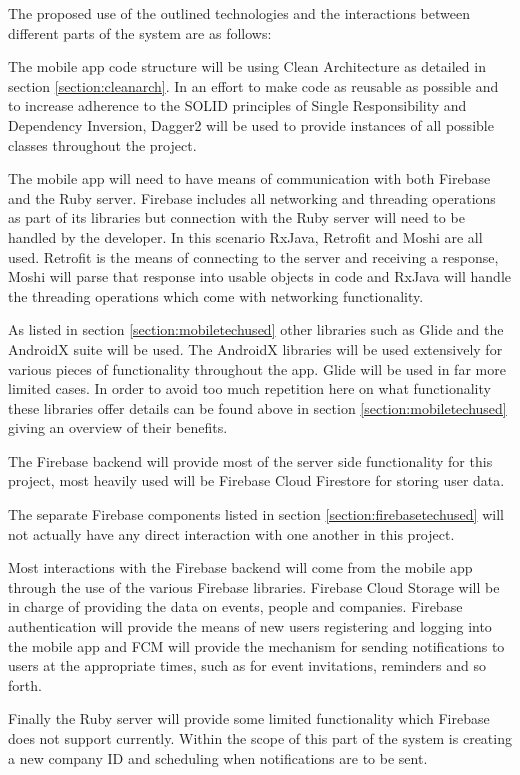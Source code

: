 The proposed use of the outlined technologies and the interactions between different parts of the system are as follows:

The mobile app code structure will be using Clean Architecture as detailed in section \ref{section:cleanarch}. In an effort to make code as reusable as possible and to increase adherence to the SOLID principles of Single Responsibility and Dependency Inversion, Dagger2 will be used to provide instances of all possible classes throughout the project.

The mobile app will need to have means of communication with both Firebase and the Ruby server. Firebase includes all networking and threading operations as part of its libraries but connection with the Ruby server will need to be handled by the developer. In this scenario RxJava, Retrofit and Moshi are all used. Retrofit is the means of connecting to the server and receiving a response, Moshi will parse that response into usable objects in code and RxJava will handle the threading operations which come with networking functionality.

As listed in section \ref{section:mobiletechused} other libraries such as Glide and the AndroidX suite will be used. The AndroidX libraries will be used extensively for various pieces of functionality throughout the app. Glide will be used in far more limited cases. In order to avoid too much repetition here on what functionality these libraries offer details can be found above in section \ref{section:mobiletechused} giving an overview of their benefits.

The Firebase backend will provide most of the server side functionality for this project, most heavily used will be Firebase Cloud Firestore for storing user data.

The separate Firebase components listed in section \ref{section:firebasetechused} will not actually have any direct interaction with one another in this project.

Most interactions with the Firebase backend will come from the mobile app through the use of the various Firebase libraries. Firebase Cloud Storage will be in charge of providing the data on events, people and companies. Firebase authentication will provide the means of new users registering and logging into the mobile app and FCM will provide the mechanism for sending notifications to users at the appropriate times, such as for event invitations, reminders and so forth.

Finally the Ruby server will provide some limited functionality which Firebase does not support currently. Within the scope of this part of the system is creating a new company ID and scheduling when notifications are to be sent.


